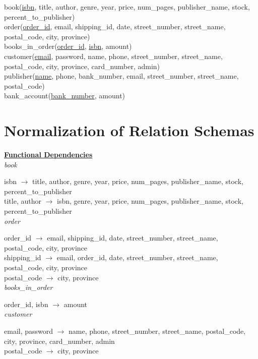 \documentclass[a4 paper]{article}
\begin{document}
book(\underline{isbn}, title, author, genre, year, price, num\_pages, publisher\_name, stock, percent\_to\_publisher)\\
\indent order(\underline{order\_id}, email, shipping\_id, date, street\_number, street\_name, postal\_code, city, province)\\
\indent books\_in\_order(\underline{order\_id}, \underline{isbn}, amount)\\
\indent customer(\underline{email}, password, name, phone, street\_number, street\_name, postal\_code, city, province, card\_number, admin)\\
\indent publisher(\underline{name}, phone, bank\_number, email, street\_number, street\_name, postal\_code)\\
\indent bank\_account(\underline{bank\_number}, amount)\\

\section{Normalization of Relation Schemas}

\underline{\textbf{Functional Dependencies}}\\

\noindent\emph{book}

isbn $\rightarrow$ title, author, genre, year, price, num\_pages, publisher\_name, stock, percent\_to\_publisher\\
\indent title, author $\rightarrow$ isbn, genre, year, price, num\_pages, publisher\_name, stock, percent\_to\_publisher\\

\noindent\emph{order}

order\_id $\rightarrow$ email, shipping\_id, date, street\_number, street\_name, postal\_code, city, province\\
\indent shipping\_id $\rightarrow$ email, order\_id, date, street\_number, street\_name, postal\_code, city, province\\
\indent postal\_code $\rightarrow$ city, province\\

\noindent\emph{books\_in\_order}

order\_id, isbn $\rightarrow$ amount\\

\noindent\emph{customer}

email, password $\rightarrow$ name, phone, street\_number, street\_name, postal\_code, city, province, card\_number, admin\\
\indent postal\_code $\rightarrow$ city, province\\
\end{document}
